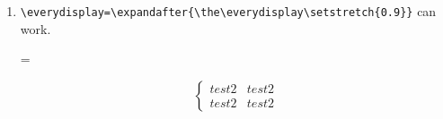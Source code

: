 \documentclass{article}
\begin{document}
\begin{enumerate}
    \item

          \verb|\everydisplay=\expandafter{\the\everydisplay\setstretch{0.9}}| can work.
          \newenvironment{CondensedCases}{%



              \everydisplay=\expandafter{\the\everydisplay\setstretch{2}}

              \par\vspace{-5ex}%
              $$\begin{cases}
                      }{
                  \end{cases}$$
              \par\vspace{-2ex}%
              \renewcommand{\\}{\mylb}
          }

          \begin{CondensedCases}
              test2 & test2\\
              test2 & test2
          \end{CondensedCases}


\end{enumerate}
\end{document}
